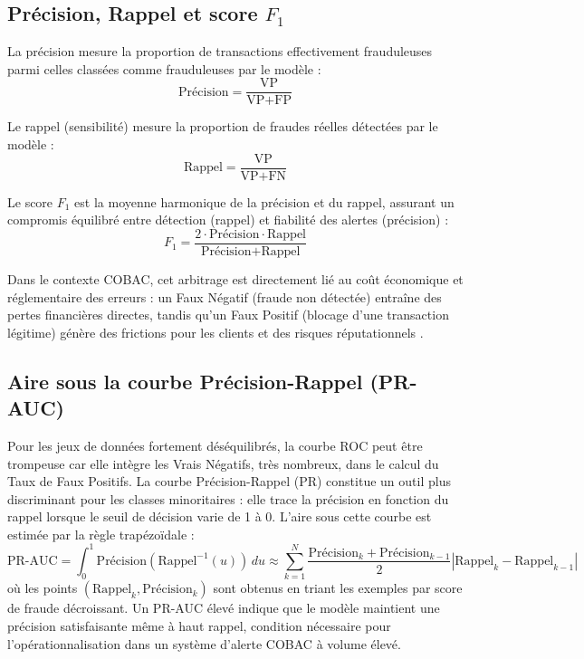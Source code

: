 \documentclass[11pt,a4paper,oneside]{report}
\theoremstyle{definition}
\theoremstyle{remark}
\begin{document}
\subsection{Précision, Rappel et score $F_1$}
\label{subsec:f1}

La précision mesure la proportion de transactions effectivement frauduleuses parmi celles classées comme frauduleuses par le modèle :
\begin{equation}
    \text{Précision} = \frac{\text{VP}}{\text{VP} + \text{FP}}
    \label{eq:precision}
\end{equation}

Le rappel (sensibilité) mesure la proportion de fraudes réelles détectées par le modèle :
\begin{equation}
    \text{Rappel} = \frac{\text{VP}}{\text{VP} + \text{FN}}
    \label{eq:rappel}
\end{equation}

Le score $F_1$ est la moyenne harmonique de la précision et du rappel, assurant un compromis équilibré entre détection (rappel) et fiabilité des alertes (précision) :
\begin{equation}
    F_1 = \frac{2 \cdot \text{Précision} \cdot \text{Rappel}}{\text{Précision} + \text{Rappel}}
    \label{eq:f1}
\end{equation}

Dans le contexte COBAC, cet arbitrage est directement lié au coût économique et réglementaire des erreurs : un Faux Négatif (fraude non détectée) entraîne des pertes financières directes, tandis qu'un Faux Positif (blocage d'une transaction légitime) génère des frictions pour les clients et des risques réputationnels \citep{gsma2024fraud}.

\subsection{Aire sous la courbe Précision-Rappel (PR-AUC)}
\label{subsec:prauc}

Pour les jeux de données fortement déséquilibrés, la courbe ROC peut être trompeuse car elle intègre les Vrais Négatifs, très nombreux, dans le calcul du Taux de Faux Positifs. La courbe Précision-Rappel (PR) constitue un outil plus discriminant pour les classes minoritaires \citep{Li2024} : elle trace la précision en fonction du rappel lorsque le seuil de décision varie de 1 à 0. L'aire sous cette courbe est estimée par la règle trapézoïdale :
\begin{equation}
    \text{PR-AUC} = \int_0^1 \text{Précision}(\text{Rappel}^{-1}(u))\,du
    \approx \sum_{k=1}^{N} \frac{\text{Précision}_k + \text{Précision}_{k-1}}{2}
    \left|\text{Rappel}_k - \text{Rappel}_{k-1}\right|
    \label{eq:prauc}
\end{equation}
où les points $(\text{Rappel}_k, \text{Précision}_k)$ sont obtenus en triant les exemples par score de fraude décroissant. Un PR-AUC élevé indique que le modèle maintient une précision satisfaisante même à haut rappel, condition nécessaire pour l'opérationnalisation dans un système d'alerte COBAC à volume élevé.
\end{document}
